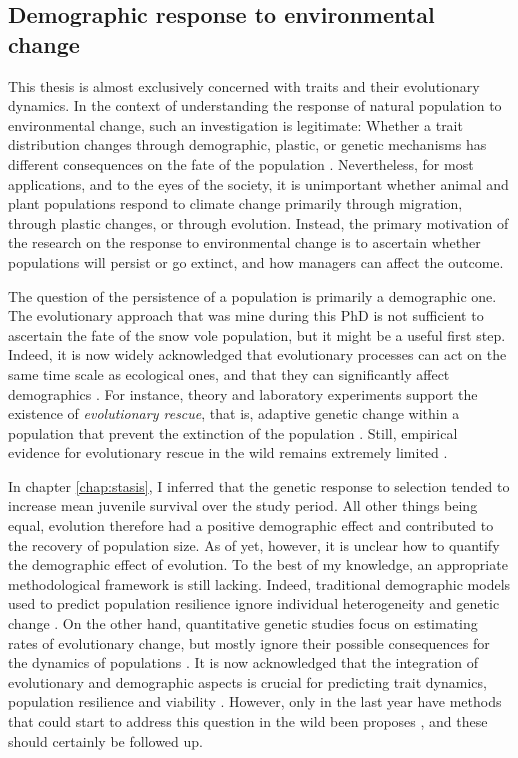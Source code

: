 \subsection{Demographic response to environmental change}
This thesis is almost exclusively concerned with traits and their evolutionary dynamics. 
In the context of understanding the response of natural population to environmental change, such an investigation is legitimate: Whether a trait distribution changes through demographic, plastic, or genetic mechanisms has different consequences on the fate of the population \parencite{Chevin2010}.
Nevertheless, for most applications, and to the eyes of the society, it is unimportant whether animal and plant populations respond to climate change primarily through migration, through plastic changes, or through evolution. Instead, the primary motivation of the research on the response to environmental change is to ascertain whether populations will persist or go extinct, and how managers can affect the outcome.

The question of the persistence of a population is primarily a demographic one. The evolutionary approach that was mine during this PhD is not sufficient to ascertain the fate of the snow vole population, but it might be a useful first step. Indeed, it is now widely acknowledged that evolutionary processes can act on the same time scale as ecological ones, and that they can significantly affect demographics \parencite{Hairston2005,Ellner2011, Chevin2010a, Turcotte2011}. For instance, theory and laboratory experiments support the existence of \emph{evolutionary rescue}, that is, adaptive genetic change within a population that prevent the extinction of the population \parencite{Gonzalez2013a, Schiffers2013a}. Still, empirical evidence for evolutionary rescue in the wild remains extremely limited \parencite{Wal2013}.

In chapter \ref{chap:stasis}, I inferred that the genetic response to selection tended to increase mean juvenile survival over the study period. All other things being equal, evolution therefore had a positive demographic effect and contributed to the recovery of population size. As of yet, however, it is unclear how to quantify the demographic effect of evolution. To the best of my knowledge, an appropriate methodological framework is still lacking. 
Indeed, traditional demographic models used to predict population resilience ignore individual heterogeneity and genetic change \parencite{Kendall2011, vindenes2015, Plard2016}. On the other hand, quantitative genetic studies focus on estimating rates of evolutionary change, but mostly ignore their possible consequences for the dynamics of populations \parencite{Coulson2010,Chevin2012}.
It is now acknowledged that the integration of evolutionary and demographic aspects is crucial for predicting trait dynamics, population resilience and viability \parencite{Schoener2011,Pelletier2012,Chevin2012,Merila2014}. However, only in the last year have methods that could start to address this question in the wild been proposes \parencite{vindenes2015, Coulson2015, Childs2016}, and these should certainly be followed up. 

